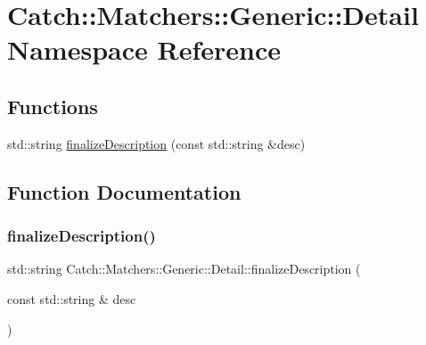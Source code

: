 \hypertarget{namespace_catch_1_1_matchers_1_1_generic_1_1_detail}{}\section{Catch\+::Matchers\+::Generic\+::Detail Namespace Reference}
\label{namespace_catch_1_1_matchers_1_1_generic_1_1_detail}
\subsection*{Functions}
\begin{DoxyCompactItemize}
\item 
std\+::string \mbox{\hyperlink{namespace_catch_1_1_matchers_1_1_generic_1_1_detail_a79ef1103073f7a8d31735436d2012835}{finalize\+Description}} (const std\+::string \&desc)
\end{DoxyCompactItemize}


\subsection{Function Documentation}
\mbox{\label{namespace_catch_1_1_matchers_1_1_generic_1_1_detail_a79ef1103073f7a8d31735436d2012835}} 
\subsubsection{\texorpdfstring{finalizeDescription()}{finalizeDescription()}}
{\footnotesize\ttfamily std\+::string Catch\+::\+Matchers\+::\+Generic\+::\+Detail\+::finalize\+Description (\begin{DoxyParamCaption}\item[{const std\+::string \&}]{desc }\end{DoxyParamCaption})}

